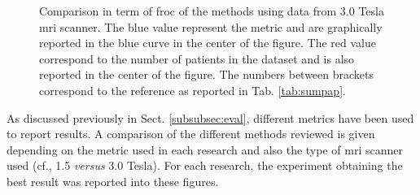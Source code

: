 \begin{figure}
\caption{Comparison in term of \ac{froc} of the methods using data from 3.0 Tesla \ac{mri} scanner. The blue value represent the metric and are graphically reported in the blue curve in the center of the figure. The red value correspond to the number of patients in the dataset and is also reported in the center of the figure. The numbers between brackets correspond to the reference as reported in Tab. \ref{tab:sumpap}.}
\label{fig:froc}
\end{figure}

As discussed previously in Sect. \ref{subsubsec:eval}, different metrics have been used to report results. A comparison of the different methods reviewed is given depending on the metric used in each research and also the type of \ac{mri} scanner used (cf., 1.5 \textit{versus} 3.0 Tesla). For each research, the experiment obtaining the best result was reported into these figures.

